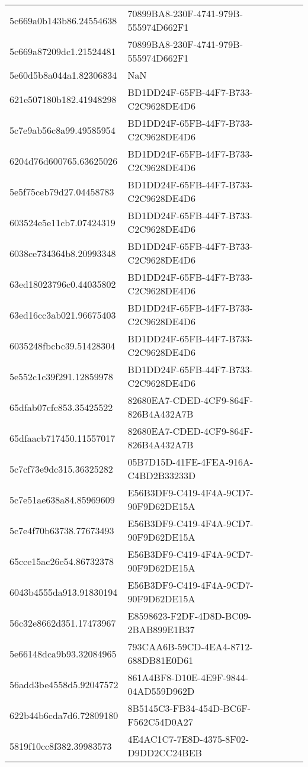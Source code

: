 \begin{tabular}{ll}
5c669a0b143b86.24554638 & 70899BA8-230F-4741-979B-555974D662F1 \\
5c669a87209dc1.21524481 & 70899BA8-230F-4741-979B-555974D662F1 \\
5e60d5b8a044a1.82306834 & NaN \\
621e507180b182.41948298 & BD1DD24F-65FB-44F7-B733-C2C9628DE4D6 \\
5c7e9ab56c8a99.49585954 & BD1DD24F-65FB-44F7-B733-C2C9628DE4D6 \\
6204d76d600765.63625026 & BD1DD24F-65FB-44F7-B733-C2C9628DE4D6 \\
5e5f75ceb79d27.04458783 & BD1DD24F-65FB-44F7-B733-C2C9628DE4D6 \\
603524e5e11cb7.07424319 & BD1DD24F-65FB-44F7-B733-C2C9628DE4D6 \\
6038ce734364b8.20993348 & BD1DD24F-65FB-44F7-B733-C2C9628DE4D6 \\
63ed18023796c0.44035802 & BD1DD24F-65FB-44F7-B733-C2C9628DE4D6 \\
63ed16cc3ab021.96675403 & BD1DD24F-65FB-44F7-B733-C2C9628DE4D6 \\
6035248fbcbc39.51428304 & BD1DD24F-65FB-44F7-B733-C2C9628DE4D6 \\
5e552c1c39f291.12859978 & BD1DD24F-65FB-44F7-B733-C2C9628DE4D6 \\
65dfab07cfc853.35425522 & 82680EA7-CDED-4CF9-864F-826B4A432A7B \\
65dfaacb717450.11557017 & 82680EA7-CDED-4CF9-864F-826B4A432A7B \\
5c7cf73e9dc315.36325282 & 05B7D15D-41FE-4FEA-916A-C4BD2B33233D \\
5c7e51ae638a84.85969609 & E56B3DF9-C419-4F4A-9CD7-90F9D62DE15A \\
5c7e4f70b63738.77673493 & E56B3DF9-C419-4F4A-9CD7-90F9D62DE15A \\
65cce15ac26e54.86732378 & E56B3DF9-C419-4F4A-9CD7-90F9D62DE15A \\
6043b4555da913.91830194 & E56B3DF9-C419-4F4A-9CD7-90F9D62DE15A \\
56c32e8662d351.17473967 & E8598623-F2DF-4D8D-BC09-2BAB899E1B37 \\
5e66148dca9b93.32084965 & 793CAA6B-59CD-4EA4-8712-688DB81E0D61 \\
56add3be4558d5.92047572 & 861A4BF8-D10E-4E9F-9844-04AD559D962D \\
622b44b6cda7d6.72809180 & 8B5145C3-FB34-454D-BC6F-F562C54D0A27 \\
5819f10cc8f382.39983573 & 4E4AC1C7-7E8D-4375-8F02-D9DD2CC24BEB \\

\end{tabular}
